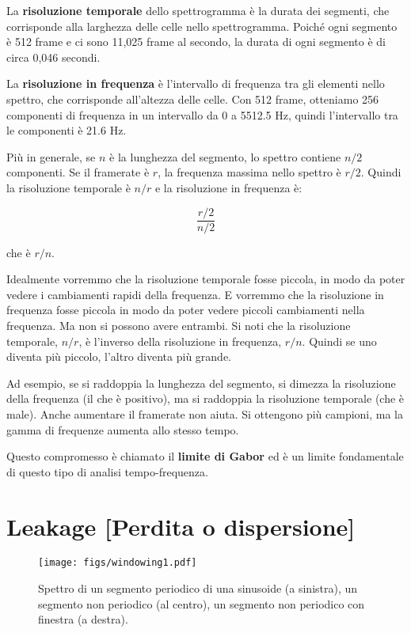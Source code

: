 \documentclass[12pt]{book} \usepackage[width=5.5in,height=8.5in, hmarginratio=3:2,vmarginratio=1:1]{geometry}
\begin{document}
La {\bf risoluzione temporale} dello spettrogramma è la durata dei segmenti, che corrisponde alla larghezza delle celle nello spettrogramma. Poiché ogni segmento è 512 frame e ci sono 11,025 frame al secondo, la durata di ogni segmento è di circa 0,046 secondi.

La {\bf risoluzione in frequenza} è l'intervallo di frequenza tra gli elementi nello spettro, che corrisponde all'altezza delle celle. Con 512 frame, otteniamo 256 componenti di frequenza in un intervallo da 0 a 5512.5 Hz, quindi l'intervallo tra le componenti è 21.6 Hz.

Più in generale, se $n$ è la lunghezza del segmento, lo spettro contiene $n/2$ componenti. Se il framerate è $r$, la frequenza massima nello spettro è $r/2$. Quindi la risoluzione temporale è $n/r$ e la risoluzione in frequenza è:

%
\[ \frac{r/2}{n/2} \] 

%
che è $r/n$.

Idealmente vorremmo che la risoluzione temporale fosse piccola, in modo da poter vedere i cambiamenti rapidi della frequenza. E vorremmo che la risoluzione in frequenza fosse piccola in modo da poter vedere piccoli cambiamenti nella frequenza. Ma non si possono avere entrambi. Si noti che la risoluzione temporale, $n/r$, è l'inverso della risoluzione in frequenza, $r/n$. Quindi se uno diventa più piccolo, l'altro diventa più grande.

Ad esempio, se si raddoppia la lunghezza del segmento, si dimezza la risoluzione della frequenza (il che è positivo), ma si raddoppia la risoluzione temporale (che è male). Anche aumentare il framerate non aiuta. Si ottengono più campioni, ma la gamma di frequenze aumenta allo stesso tempo.

Questo compromesso è chiamato il {\bf limite di Gabor} ed è un limite fondamentale di questo tipo di analisi tempo-frequenza.

\section{Leakage [Perdita o dispersione]} 

\begin{figure} 

\centerline{\texttt{[image: figs/windowing1.pdf]}} \caption{Spettro di un segmento periodico di una sinusoide (a sinistra), un segmento non periodico (al centro), un segmento non periodico con finestra (a destra).} \label{fig.windowing1} \end{figure} 
\end{document}
